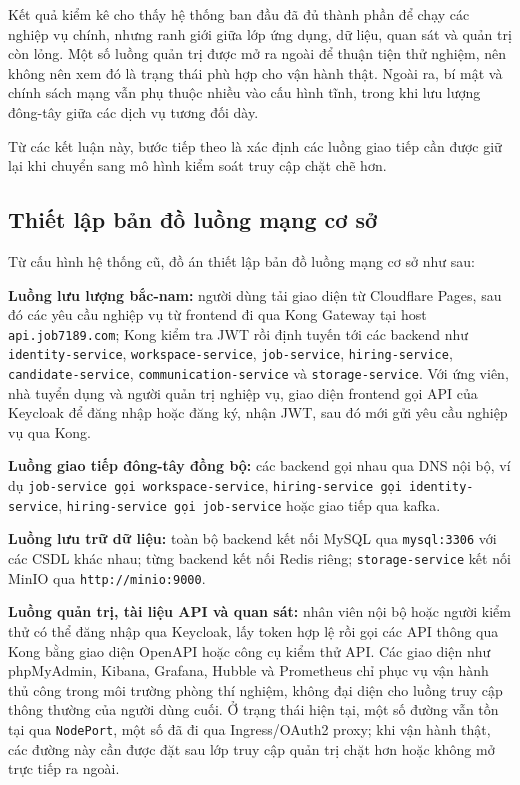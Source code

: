 Kết quả kiểm kê cho thấy hệ thống ban đầu đã đủ thành phần để chạy các nghiệp vụ chính, nhưng ranh giới giữa lớp ứng dụng, dữ liệu, quan sát và quản trị còn lỏng. Một số luồng quản trị được mở ra ngoài để thuận tiện thử nghiệm, nên không nên xem đó là trạng thái phù hợp cho vận hành thật. Ngoài ra, bí mật và chính sách mạng vẫn phụ thuộc nhiều vào cấu hình tĩnh, trong khi lưu lượng đông-tây giữa các dịch vụ tương đối dày.

Từ các kết luận này, bước tiếp theo là xác định các luồng giao tiếp cần được giữ lại khi chuyển sang mô hình kiểm soát truy cập chặt chẽ hơn.

\subsection{Thiết lập bản đồ luồng mạng cơ sở}
\label{sec:c3_baseline_network_flow}

Từ cấu hình hệ thống cũ, đồ án thiết lập bản đồ luồng mạng cơ sở như sau:

\textbf{Luồng lưu lượng bắc-nam:} người dùng tải giao diện từ Cloudflare Pages, sau đó các yêu cầu nghiệp vụ từ frontend đi qua Kong Gateway tại host \texttt{api.job7189.com}; Kong kiểm tra JWT rồi định tuyến tới các backend như \texttt{identity-service}, \texttt{workspace-service}, \texttt{job-service}, \texttt{hiring-service}, \texttt{candidate-service}, \texttt{communication-service} và \texttt{storage-service}. Với ứng viên, nhà tuyển dụng và người quản trị nghiệp vụ, giao diện frontend gọi API của Keycloak để đăng nhập hoặc đăng ký, nhận JWT, sau đó mới gửi yêu cầu nghiệp vụ qua Kong.

\textbf{Luồng giao tiếp đông-tây đồng bộ:} các backend gọi nhau qua DNS nội bộ, ví dụ \texttt{job-service gọi workspace-service}, \texttt{hiring-service gọi identity-service}, \texttt{hiring-service gọi job-service} hoặc giao tiếp qua kafka.

\textbf{Luồng lưu trữ dữ liệu:} toàn bộ backend kết nối MySQL qua \texttt{mysql:3306} với các CSDL khác nhau; từng backend kết nối Redis riêng; \texttt{storage-service} kết nối MinIO qua \texttt{http://minio:9000}.

\textbf{Luồng quản trị, tài liệu API và quan sát:} nhân viên nội bộ hoặc người kiểm thử có thể đăng nhập qua Keycloak, lấy token hợp lệ rồi gọi các API thông qua Kong bằng giao diện OpenAPI hoặc công cụ kiểm thử API. Các giao diện như phpMyAdmin, Kibana, Grafana, Hubble và Prometheus chỉ phục vụ vận hành thủ công trong môi trường phòng thí nghiệm, không đại diện cho luồng truy cập thông thường của người dùng cuối. Ở trạng thái hiện tại, một số đường vẫn tồn tại qua \texttt{NodePort}, một số đã đi qua Ingress/OAuth2 proxy; khi vận hành thật, các đường này cần được đặt sau lớp truy cập quản trị chặt hơn hoặc không mở trực tiếp ra ngoài.

